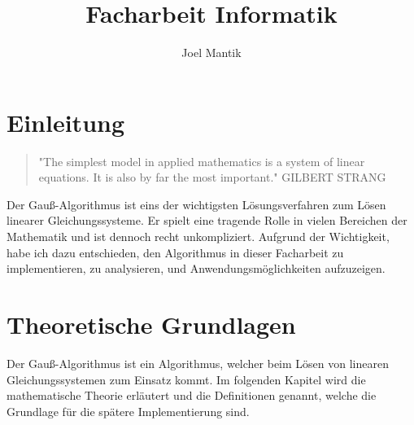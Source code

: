 \documentclass[a4paper, 12pt]{report}
\title{Facharbeit Informatik}
\author{Joel Mantik}
\begin{document}
\maketitle
\begin{sloppypar}
\tableofcontents

\chapter{Einleitung}
\begin{quote}
    "The simplest model in applied mathematics is a system of linear equations. It is also by far the most important."
    \newline GILBERT STRANG
\end{quote}
Der Gauß-Algorithmus ist eins der wichtigsten Lösungsverfahren zum Lösen linearer Gleichungssysteme.
Er spielt eine tragende Rolle in vielen Bereichen der Mathematik und ist dennoch  recht unkompliziert.
    Aufgrund der Wichtigkeit, habe ich dazu entschieden, den Algorithmus in dieser
Facharbeit zu implementieren,
zu analysieren, und Anwendungsmöglichkeiten aufzuzeigen.

\chapter{Theoretische Grundlagen}
Der Gauß-Algorithmus ist ein Algorithmus, welcher beim Lösen von linearen Gleichungssystemen zum Einsatz kommt. Im folgenden Kapitel wird die mathematische
Theorie erläutert und die Definitionen genannt, welche die Grundlage für die spätere Implementierung sind.


\end{sloppypar}
\end{document}
